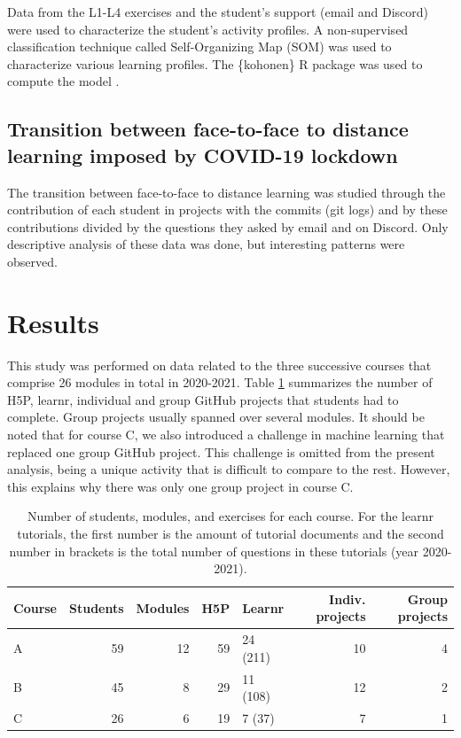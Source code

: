 \documentclass{aims}
\theoremstyle{definition}
\begin{document}
Data from the L1-L4 exercises and the student's support (email and
Discord) were used to characterize the student's activity profiles. A
non-supervised classification technique called Self-Organizing Map (SOM)
\cite{Kohonen1995} was used to characterize various learning profiles.
The \{kohonen\} R package was used to compute the model
\cite{Wehrens2018}.

\hypertarget{transition-between-face-to-face-to-distance-learning-imposed-by-covid-19-lockdown}{%
\subsection{Transition between face-to-face to distance learning imposed
by COVID-19
lockdown}\label{transition-between-face-to-face-to-distance-learning-imposed-by-covid-19-lockdown}}

The transition between face-to-face to distance learning was studied
through the contribution of each student in projects with the commits
(git logs) and by these contributions divided by the questions they
asked by email and on Discord. Only descriptive analysis of these data
was done, but interesting patterns were observed.

\hypertarget{results}{%
\section{Results}\label{results}}

This study was performed on data related to the three successive courses
that comprise 26 modules in total in 2020-2021. Table
\ref {tab:tab_course} summarizes the number of H5P, learnr, individual
and group GitHub projects that students had to complete. Group projects
usually spanned over several modules. It should be noted that for course
C, we also introduced a challenge in machine learning that replaced one
group GitHub project. This challenge is omitted from the present
analysis, being a unique activity that is difficult to compare to the
rest. However, this explains why there was only one group project in
course C.

\begin{table}

\caption{\label{tab:tab_course_summary}\label{tab:tab_course} Number of students, modules, and exercises for each course. For the learnr tutorials, the first number is the amount of tutorial documents and the second number in brackets is the total number of questions in these tutorials (year 2020-2021).}
\centering
\begin{tabular}[t]{l|r|r|r|l|r|r}
\hline
Course & Students & Modules & H5P & Learnr & Indiv. projects & Group projects\\
\hline
A & 59 & 12 & 59 & 24 (211) & 10 & 4\\
\hline
B & 45 & 8 & 29 & 11 (108) & 12 & 2\\
\hline
C & 26 & 6 & 19 & 7 (37) & 7 & 1\\
\hline
\end{tabular}
\end{table}
\end{document}
